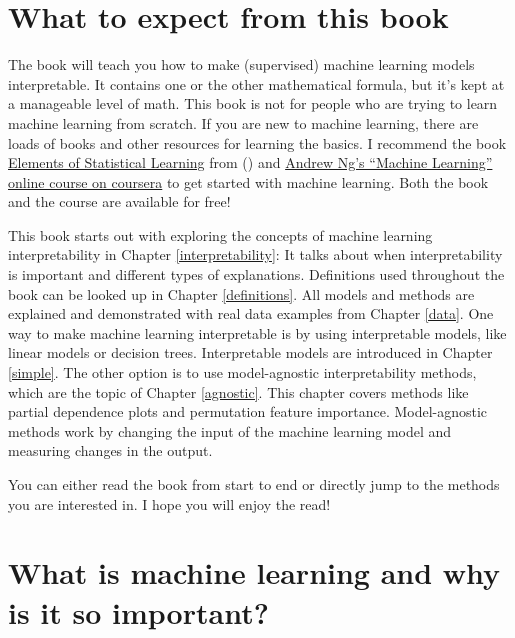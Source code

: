 \documentclass[12pt,]{krantz}
\theoremstyle{definition}
\theoremstyle{definition}
\theoremstyle{definition}
\theoremstyle{remark}
\begin{document}
\section{What to expect from this
book}\label{what-to-expect-from-this-book}

The book will teach you how to make (supervised) machine learning models
interpretable. It contains one or the other mathematical formula, but
it's kept at a manageable level of math. This book is not for people who
are trying to learn machine learning from scratch. If you are new to
machine learning, there are loads of books and other resources for
learning the basics. I recommend the book
\href{https://web.stanford.edu/~hastie/ElemStatLearn/}{Elements of
Statistical Learning} from (\citet{Hastie2009}) and
\href{https://www.coursera.org/learn/machine-learning}{Andrew Ng's
``Machine Learning'' online course on coursera} to get started with
machine learning. Both the book and the course are available for free!

This book starts out with exploring the concepts of machine learning
interpretability in Chapter \ref{interpretability}: It talks about when
interpretability is important and different types of explanations.
Definitions used throughout the book can be looked up in Chapter
\ref{definitions}. All models and methods are explained and demonstrated
with real data examples from Chapter \ref{data}. One way to make machine
learning interpretable is by using interpretable models, like linear
models or decision trees. Interpretable models are introduced in Chapter
\ref{simple}. The other option is to use model-agnostic interpretability
methods, which are the topic of Chapter \ref{agnostic}. This chapter
covers methods like partial dependence plots and permutation feature
importance. Model-agnostic methods work by changing the input of the
machine learning model and measuring changes in the output.

You can either read the book from start to end or directly jump to the
methods you are interested in. I hope you will enjoy the read!

\section{What is machine learning and why is it so
important?}\label{what-is-machine-learning-and-why-is-it-so-important}
\end{document}
